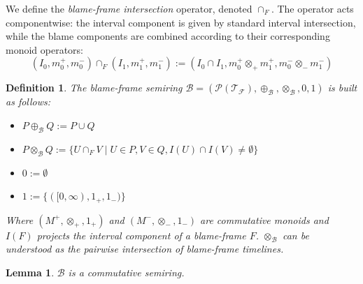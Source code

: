 \documentclass[
]{ceurart}
\theoremstyle{plain}
\newtheorem{definition}{Definition}
\newtheorem{lemma}{Lemma}
\begin{document}
We define the \emph{blame-frame intersection} operator, denoted $\cap_F$. The operator acts componentwise: the interval component is given by standard interval intersection, while the blame components are combined according to their corresponding monoid operators:
\[
(I_0, m_0^+, m_0^-)\cap_F (I_1, m_1^+, m_1^-) := (I_0\cap I_1, m_0^+\otimes_{+} m_1^+, m_0^-\otimes_{-} m_1^-)
\]
\begin{definition}
    The \emph{blame-frame semiring} $\mathcal{B}=(\mathcal{P}(\mathcal{T}_\mathcal{F}),\oplus_\mathcal{B},\otimes_\mathcal{B},0,1)$ is built as follows:
    \begin{itemize}
        \item $P \oplus_\mathcal{B} Q := P \cup Q$
        \item $P \otimes_\mathcal{B} Q := \{U \cap_F V \mid U\in P,V\in Q, I(U) \cap I(V) \neq \emptyset \}$
        \item $0 := \emptyset$
        \item $1 := \{([0,\infty),1_{+},1_{-})\}$
    \end{itemize}
    Where $(M^+, \otimes_{+}, 1_{+})$ and $(M^-, \otimes_{-}, 1_{-})$ are commutative monoids and $I(F)$ projects the interval component of a blame-frame $F$. $\otimes_\mathcal{B}$ can be understood as the pairwise intersection of blame-frame timelines.
\end{definition}

\begin{lemma}\label{lem:Bsemiring}
    $\mathcal{B}$ is a commutative semiring.
\end{lemma}
\end{document}
